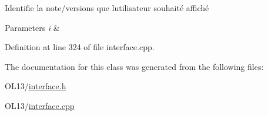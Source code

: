 Identifie la note/versions que l\textquotesingle{}utilisateur souhaité affiché 


\begin{DoxyParams}{Parameters}
{\em i} & \\
\hline
\end{DoxyParams}


Definition at line 324 of file interface.\+cpp.



The documentation for this class was generated from the following files\+:\begin{DoxyCompactItemize}
\item 
O\+L13/\hyperlink{interface_8h}{interface.\+h}\item 
O\+L13/\hyperlink{interface_8cpp}{interface.\+cpp}\end{DoxyCompactItemize}
